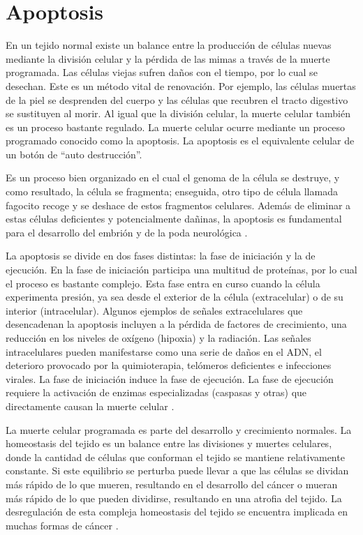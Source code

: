 \section{Apoptosis}
\hspace{.1cm}En un tejido normal existe un balance entre la producción de células nuevas mediante la división celular y la pérdida de las mimas a través de la muerte programada. Las células viejas sufren daños con el tiempo, por lo cual se desechan. Este es un método vital de renovación. Por ejemplo, las células muertas de la piel se desprenden del cuerpo y las células que recubren el tracto digestivo se sustituyen al morir. Al igual que la división celular, la muerte celular también es un proceso bastante regulado. La muerte celular ocurre mediante un proceso programado conocido como la apoptosis. La apoptosis es el equivalente celular de un botón de ``auto destrucción''.

\hspace{.1cm}Es un proceso bien organizado en el cual el genoma de la célula se destruye, y como resultado, la célula se fragmenta; enseguida, otro tipo de célula llamada fagocito recoge y se deshace de estos fragmentos celulares. Además de eliminar a estas células deficientes y potencialmente dañinas, la apoptosis es fundamental para el desarrollo del embrión y de la poda neurológica \cite{cancerquest2024}.

\hspace{.1cm}La apoptosis se divide en dos fases distintas: la fase de iniciación y la de ejecución. En la fase de iniciación participa una multitud de proteínas, por lo cual el proceso es bastante complejo. Esta fase entra en curso cuando la célula experimenta presión, ya sea desde el exterior de la célula (extracelular) o de su interior (intracelular). Algunos ejemplos de señales extracelulares que desencadenan la apoptosis incluyen a la pérdida de factores de crecimiento, una reducción en los niveles de oxígeno (hipoxia) y la radiación. Las señales intracelulares pueden manifestarse como una serie de daños en el ADN, el deterioro provocado por la quimioterapia, telómeros deficientes e infecciones virales. La fase de iniciación induce la fase de ejecución. La fase de ejecución requiere la activación de enzimas especializadas (caspasas y otras) que directamente causan la muerte celular \cite{cancerquest2024}.

\hspace{.1cm}La muerte celular programada es parte del desarrollo y crecimiento normales. La homeostasis del tejido es un balance entre las divisiones y muertes celulares, donde la cantidad de células que conforman el tejido se mantiene relativamente constante. Si este equilibrio se perturba puede llevar a que las células se dividan más rápido de lo que mueren, resultando en el desarrollo del cáncer o mueran más rápido de lo que pueden dividirse, resultando en una atrofia del tejido. La desregulación de esta compleja homeostasis del tejido se encuentra implicada en muchas formas de cáncer \cite{viabarre2019}.

